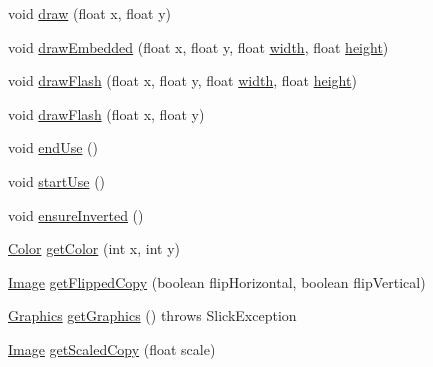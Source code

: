 \begin{DoxyCompactItemize}
\item 
void \mbox{\hyperlink{classorg_1_1newdawn_1_1slick_1_1_big_image_a94aa674e521e409c45afcfd627b49772}{draw}} (float x, float y)
\item 
void \mbox{\hyperlink{classorg_1_1newdawn_1_1slick_1_1_big_image_a0d38fe005990974b0d166d834fc4b318}{draw\+Embedded}} (float x, float y, float \mbox{\hyperlink{classorg_1_1newdawn_1_1slick_1_1_image_a7d02c85e21b388428cfe5cc5c82714a1}{width}}, float \mbox{\hyperlink{classorg_1_1newdawn_1_1slick_1_1_image_a54397a37823bc59ddc79ec70dc5cf226}{height}})
\item 
void \mbox{\hyperlink{classorg_1_1newdawn_1_1slick_1_1_big_image_ae1a900a9ad455200db7d54ddc10d62fb}{draw\+Flash}} (float x, float y, float \mbox{\hyperlink{classorg_1_1newdawn_1_1slick_1_1_image_a7d02c85e21b388428cfe5cc5c82714a1}{width}}, float \mbox{\hyperlink{classorg_1_1newdawn_1_1slick_1_1_image_a54397a37823bc59ddc79ec70dc5cf226}{height}})
\item 
void \mbox{\hyperlink{classorg_1_1newdawn_1_1slick_1_1_big_image_a01ecce26c0126c8eb147b766e18f8a89}{draw\+Flash}} (float x, float y)
\item 
void \mbox{\hyperlink{classorg_1_1newdawn_1_1slick_1_1_big_image_ae7b6a5090b09207d602ec851cbe98985}{end\+Use}} ()
\item 
void \mbox{\hyperlink{classorg_1_1newdawn_1_1slick_1_1_big_image_ad5fd0ca98577d193516f55bab105a482}{start\+Use}} ()
\item 
void \mbox{\hyperlink{classorg_1_1newdawn_1_1slick_1_1_big_image_a9de7323dccd03d0aa1bd1a5cfd22424c}{ensure\+Inverted}} ()
\item 
\mbox{\hyperlink{classorg_1_1newdawn_1_1slick_1_1_color}{Color}} \mbox{\hyperlink{classorg_1_1newdawn_1_1slick_1_1_big_image_a1890cffdc17cfab2eac623b1b5fd2eed}{get\+Color}} (int x, int y)
\item 
\mbox{\hyperlink{classorg_1_1newdawn_1_1slick_1_1_image}{Image}} \mbox{\hyperlink{classorg_1_1newdawn_1_1slick_1_1_big_image_a3c4f3b625f9d079b3676ed1cd8478181}{get\+Flipped\+Copy}} (boolean flip\+Horizontal, boolean flip\+Vertical)
\item 
\mbox{\hyperlink{classorg_1_1newdawn_1_1slick_1_1_graphics}{Graphics}} \mbox{\hyperlink{classorg_1_1newdawn_1_1slick_1_1_big_image_af9b96a392144c8da27db05cdd362e02c}{get\+Graphics}} ()  throws Slick\+Exception 
\item 
\mbox{\hyperlink{classorg_1_1newdawn_1_1slick_1_1_image}{Image}} \mbox{\hyperlink{classorg_1_1newdawn_1_1slick_1_1_big_image_af08b11da9979055cdfd873e567340b1e}{get\+Scaled\+Copy}} (float scale)

\end{DoxyCompactItemize}
